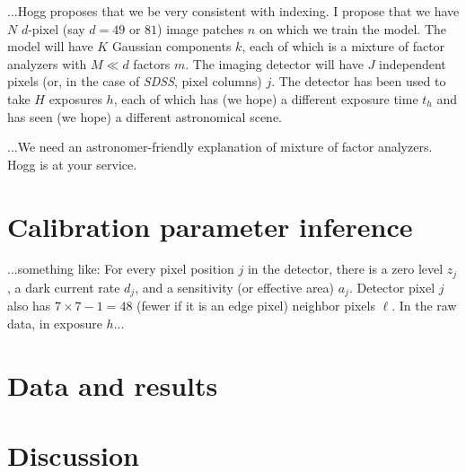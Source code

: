 \documentclass[12pt]{article}
\newcommand{\project}[1]{\textsl{#1}}
\begin{document}
...Hogg proposes that we be very consistent with indexing.  I propose
that we have $N$ $d$-pixel (say $d=49$ or $81$) image patches $n$ on
which we train the model.  The model will have $K$ Gaussian components
$k$, each of which is a mixture of factor analyzers with $M\ll d$
factors $m$.  The imaging detector will have $J$ independent pixels
(or, in the case of \project{SDSS}, pixel columns) $j$.  The detector
has been used to take $H$ exposures $h$, each of which has (we hope) a
different exposure time $t_h$ and has seen (we hope) a different
astronomical scene.


...We need an astronomer-friendly explanation of mixture of factor
analyzers.  Hogg is at your service.

\section{Calibration parameter inference}

...something like: For every pixel position $j$ in the detector, there
is a zero level $z_j$, a dark current rate $d_j$, and a sensitivity
(or effective area) $a_j$.  Detector pixel $j$ also has $7\times
7-1=48$ (fewer if it is an edge pixel) neighbor pixels $\ell$.  In the
raw data, in exposure $h$...

\section{Data and results}

\section{Discussion}
\end{document}
